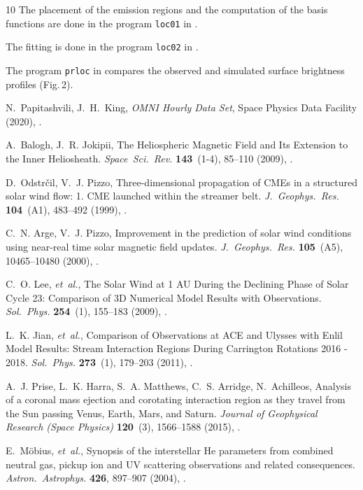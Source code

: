 \documentclass[12pt]{article}
\newcommand*\aap{Astron.~Astrophys.}
\newcommand*\jgr{J.~Geophys.~Res.}
\newcommand*\solphys{Sol.~Phys.}
\newcommand*\ssr{Space~Sci.~Rev.}
\begin{document}
\begin{thebibliography}{10}
The placement of the emission regions and the computation of the basis
  functions are done in the program {\tt loc01} in \cite{zenodo_doi}.

The fitting is done in the program {\tt loc02} in \cite{zenodo_doi}.

The program {\tt prloc} in \cite{zenodo_doi} compares the observed and simulated
surface brightness profiles (Fig.\,2).

N.~Papitashvili, J.~H.~King, {\sl OMNI Hourly Data Set}, Space Physics Data
  Facility (2020), .

A.~{Balogh}, J.~R. {Jokipii}, {The Heliospheric Magnetic Field and Its
  Extension to the Inner Heliosheath}. \emph{\ssr} \textbf{143}~(1-4), 85--110
  (2009), .

D.~{Odstr{\v{c}}il}, V.~J. {Pizzo}, {Three-dimensional propagation of CMEs in a
  structured solar wind flow: 1. CME launched within the streamer belt}.
  \emph{\jgr} \textbf{104}~(A1), 483--492 (1999), .

C.~N. {Arge}, V.~J. {Pizzo}, {Improvement in the prediction of solar wind
  conditions using near-real time solar magnetic field updates}. \emph{\jgr}
  \textbf{105}~(A5), 10465--10480 (2000), .

C.~O. {Lee}, \emph{et~al.}, {The Solar Wind at 1 AU During the Declining Phase
  of Solar Cycle 23: Comparison of 3D Numerical Model Results with
  Observations}. \emph{\solphys} \textbf{254}~(1), 155--183 (2009),
  .

L.~K. {Jian}, \emph{et~al.}, {Comparison of Observations at ACE and Ulysses
  with Enlil Model Results: Stream Interaction Regions During Carrington
  Rotations 2016 - 2018}. \emph{\solphys} \textbf{273}~(1), 179--203 (2011),
  .

A.~J. {Prise}, L.~K. {Harra}, S.~A. {Matthews}, C.~S. {Arridge},
  N.~{Achilleos}, {Analysis of a coronal mass ejection and corotating
  interaction region as they travel from the Sun passing Venus, Earth, Mars,
  and Saturn}. \emph{Journal of Geophysical Research (Space Physics)}
  \textbf{120}~(3), 1566--1588 (2015), .

E.~{M{\"o}bius}, \emph{et~al.}, {Synopsis of the interstellar He parameters
  from combined neutral gas, pickup ion and UV scattering observations and
  related consequences}. \emph{\aap} \textbf{426}, 897--907 (2004),
  .


\end{thebibliography}
\end{document}
